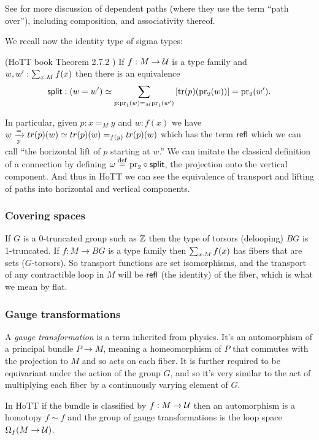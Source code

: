 See \cite{Symmetry} for more discussion of dependent paths (where they use the term ``path over''), including composition, and associativity thereof.

We recall now the identity type of sigma types:

\begin{mythm}\label{thm:idsit}
(HoTT book Theorem 2.7.2 \cite{hottbook}) If \( f:M\to \mathcal{U} \) is a type family and \( w,w':\sum_{x:M}f(x) \) then there is an equivalence 
\[ 
\mathsf{split}:(w=w')\simeq \sum_{p:\mathrm{pr}_1(w)=_M\mathrm{pr}_1(w')} \left[\mathrm{tr}(p)(\mathrm{pr}_2(w))\right] = \mathrm{pr}_2(w').
\]
\end{mythm}

In particular, given \( p:x=_M y \) and \( w:f(x) \) we have \( w\xrightarrow[{p}]{=}tr(p)(w)\simeq tr(p)(w)=_{f(y)}tr(p)(w) \) which has the term \( \mathsf{refl} \) which we can call ``the horizontal lift of \( p \) starting at \( w \).'' We can imitate the classical definition of a connection by defining \( \omega\stackrel{\mathrm{def}}{=} \mathrm{pr}_2\circ\mathsf{split} \), the projection onto the vertical component. And thus in HoTT we can see the equivalence of transport and lifting of paths into horizontal and vertical components.

\subsubsection{Covering spaces}

If \( G \) is a 0-truncated group such as \( \mathbb{Z} \) then the type of torsors (delooping) \( BG \) is 1-truncated. If \( f:M\to BG \) is a type family then \( \sum_{x:M}f(x) \) has fibers that are sets (\( G \)-torsors). So transport functions are set isomorphisms, and the transport of any contractible loop in \( M \) will be \( \mathsf{refl} \) (the identity) of the fiber, which is what we mean by flat.

\subsubsection{Gauge transformations}

A \emph{gauge transformation} is a term inherited from physics. It's an automorphism of a principal bundle \( P\to M \), meaning a homeomorphism of \( P \) that commutes with the projection to \( M \) and so acts on each fiber. It is further required to be equivariant under the action of the group \( G \), and so it's very similar to the act of multiplying each fiber by a continuously varying element of \( G \).

In HoTT if the bundle is classified by \( f:M\to \mathcal{U} \) then an automorphism is a homotopy \( f\sim f \) and the group of gauge transformations is the loop space \( \Omega_f(M\to \mathcal{U}) \). 

